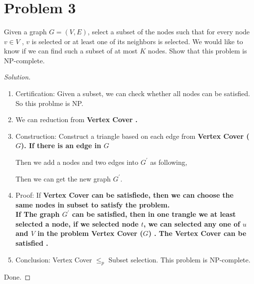 \documentclass[a4paper]{article}
\newenvironment{solution}
  {\renewcommand\qedsymbol{$\blacksquare$}\begin{proof}[Solution]}
  {\end{proof}}
\begin{document}
\section*{Problem 3 }
\paragraph{}
Given a graph $G = (V, E)$, select a subset of the nodes such that for every node $v \in V$ , $v$ is selected or
at least one of its neighbors is selected. We would like to know if we can find such a subset of at most $K$
nodes. Show that this problem is NP-complete.


\begin{solution}\
  \begin{enumerate}[(1)]
    \item Certification: Given a subset, we can check whether all nodes can be satisfied. So this problme is NP.
    \item We can reduction from \bfseries Vertex Cover \mdseries .
    \item Construction: Construct a triangle based on each edge from \bfseries Vertex Cover ($G$)\mdseries. If there is an edge in $G$
    \begin{center}
    \end{center}
    Then we add a nodes and two edges into $G^{\prime}$ as following,
    \begin{center}
    \end{center}
    Then we can get the new graph $G^{\prime}$.
    \item Proof: If \bfseries Vertex Cover \mdseries can be satisfiede, then we can choose the same nodes in subset to satisfy the problem.\\
    If The graph $G^{\prime}$ can be satisfied, then in one trangle we at least selected a node, if we selected node $t$, we can selected any one of $u$ and $V$ in the problem \bfseries Vertex Cover ($G$) \mdseries. The \bfseries Vertex Cover \mdseries can be satisfied .
    \item Conclusion: Vertex Cover $\le_{p}$ Subset selection. This problem is NP-complete.
  \end{enumerate}
  Done.
\end{solution}
\end{document}
